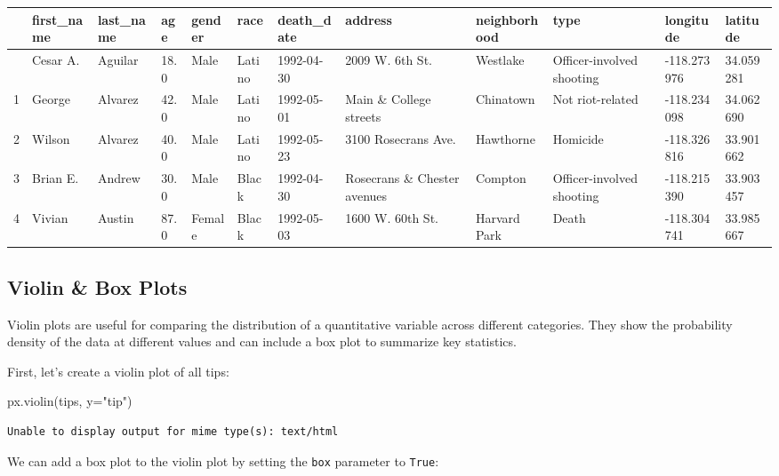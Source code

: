 \documentclass[
  letterpaper,
  DIV=11,
  numbers=noendperiod]{scrreprt}
\newenvironment{Shaded}{\begin{snugshade}}{\end{snugshade}}
\newcommand{\NormalTok}[1]{\textcolor[rgb]{0.00,0.23,0.31}{#1}}
\newcommand{\OperatorTok}[1]{\textcolor[rgb]{0.37,0.37,0.37}{#1}}
\newcommand{\StringTok}[1]{\textcolor[rgb]{0.13,0.47,0.30}{#1}}
\begin{document}
\begin{tcolorbox}
\begin{longtable}[]{@{}llllllllllll@{}}
\toprule\noalign{}
& first\_name & last\_name & age & gender & race & death\_date & address
& neighborhood & type & longitude & latitude \\
\midrule\noalign{}
\endhead
\bottomrule\noalign{}
\endlastfoot
0 & Cesar A. & Aguilar & 18.0 & Male & Latino & 1992-04-30 & 2009 W. 6th
St. & Westlake & Officer-involved shooting & -118.273976 & 34.059281 \\
1 & George & Alvarez & 42.0 & Male & Latino & 1992-05-01 & Main \&
College streets & Chinatown & Not riot-related & -118.234098 &
34.062690 \\
2 & Wilson & Alvarez & 40.0 & Male & Latino & 1992-05-23 & 3100
Rosecrans Ave. & Hawthorne & Homicide & -118.326816 & 33.901662 \\
3 & Brian E. & Andrew & 30.0 & Male & Black & 1992-04-30 & Rosecrans \&
Chester avenues & Compton & Officer-involved shooting & -118.215390 &
33.903457 \\
4 & Vivian & Austin & 87.0 & Female & Black & 1992-05-03 & 1600 W. 60th
St. & Harvard Park & Death & -118.304741 & 33.985667 \\
\end{longtable}

\end{tcolorbox}

\subsection{Violin \& Box Plots}\label{violin-box-plots}

Violin plots are useful for comparing the distribution of a quantitative
variable across different categories. They show the probability density
of the data at different values and can include a box plot to summarize
key statistics.

First, let's create a violin plot of all tips:

\begin{Shaded}
\begin{Highlighting}[]
\NormalTok{px.violin(tips, y}\OperatorTok{=}\StringTok{"tip"}\NormalTok{)}
\end{Highlighting}
\end{Shaded}

\begin{verbatim}
Unable to display output for mime type(s): text/html
\end{verbatim}

We can add a box plot to the violin plot by setting the \texttt{box}
parameter to \texttt{True}:
\end{document}
